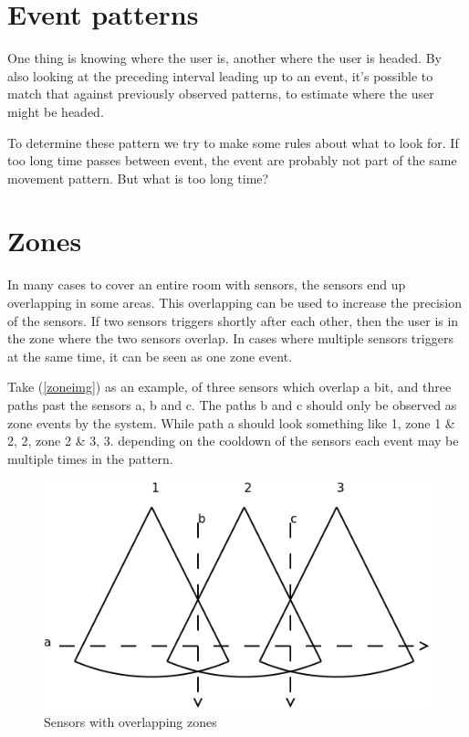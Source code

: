 \section{Event patterns}
\label{eventpatterns}

One thing is knowing where the user is, another where the user is headed. By also looking at the preceding interval leading up to an event, it's possible to match that against previously observed patterns, to estimate where the user might be headed.

To determine these pattern we try to make some rules about what to look for. If too long time passes between event, the event are probably not part of the same movement pattern. But what is too long time? 

\section{Zones}
\label{zones}

In many cases to cover an entire room with sensors, the sensors end up overlapping in some areas. This overlapping can be used to increase the precision of the sensors. If two sensors triggers shortly after each other, then the user is in the zone where the two sensors overlap. In cases where multiple sensors triggers at the same time, it can be seen as one zone event.

Take (\autoref{zoneimg}) as an example, of three sensors which overlap a bit, and three paths past the sensors a, b and c. The paths b and c should only be observed as zone events by the system. While path a should look something like 1, zone 1 \& 2, 2, zone 2 \& 3, 3. depending on the cooldown of the sensors each event may be multiple times in the pattern.

\begin{figure}[htbp]
\centering
\includegraphics[keepaspectratio,width=\textwidth,height=0.75\textheight]{figures/zone.png}
\caption{Sensors with overlapping zones}
\label{zoneimg}
\end{figure}



